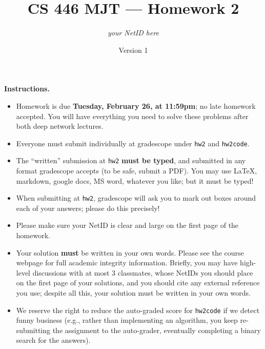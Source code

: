 \documentclass{article}
\title{CS 446 MJT --- Homework 2}
\author{\emph{your NetID here}}
\date{Version 1}
\theoremstyle{definition}
\theoremstyle{remark}
\begin{document}
        \maketitle

        \textbf{Instructions.}
        \begin{itemize}
            \item
                Homework is due \textbf{Tuesday, February 26, at 11:59pm}; no late homework accepted.
                You will have everything you need to solve these problems after both deep network
                lectures.

            \item
                Everyone must submit individually at gradescope under \texttt{hw2} and \texttt{hw2code}.


            \item
                The ``written'' submission at \texttt{hw2} \textbf{must be typed}, and submitted in
                any format gradescope accepts (to be safe, submit a PDF).  You may use \LaTeX, markdown,
                google docs, MS word, whatever you like; but it must be typed!


            \item
                When submitting at \texttt{hw2}, gradescope will ask you to mark out boxes
                around each of your answers; please do this precisely!

            \item
                Please make sure your NetID is clear and large on the first page of the homework.

            \item
                Your solution \textbf{must} be written in your own words.
                Please see the course webpage for full academic integrity information.
                Briefly, you may have high-level discussions with at most 3 classmates,
                whose NetIDs you should place on the first page of your solutions,
                and you should cite any external reference you use; despite all this,
                your solution must be written in your own words.

            \item
                We reserve the right to reduce the auto-graded score for \texttt{hw2code}
                if we detect funny business (e.g., rather than implementing an algorithm,
                you keep re-submitting the assignment to the auto-grader, eventually completing
                a binary search for the answers).


\end{itemize}
\end{document}
